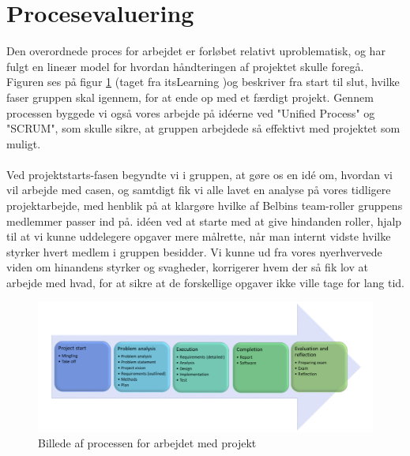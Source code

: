 \clearpage
\section{Procesevaluering}
Den overordnede proces for arbejdet er forløbet relativt uproblematisk, og har fulgt en lineær model for hvordan håndteringen af projektet skulle foregå. Figuren ses på figur \ref{fig:processen} (taget fra itsLearning \cite{url_process})og beskriver fra start til slut, hvilke faser gruppen skal igennem, for at ende op med et færdigt projekt. Gennem processen byggede vi også vores arbejde på idéerne ved "Unified Process" og "SCRUM", som skulle sikre, at gruppen arbejdede så effektivt med projektet som muligt.\\\\
Ved projektstarts-fasen begyndte vi i gruppen, at gøre os en idé om, hvordan vi vil arbejde med casen, og samtdigt fik vi alle lavet en analyse på vores tidligere projektarbejde, med henblik på at klargøre hvilke af Belbins team-roller gruppens medlemmer passer ind på. idéen ved at starte med at give hindanden roller, hjalp til at vi kunne uddelegere opgaver mere målrette, når man internt vidste hvilke styrker hvert medlem i gruppen besidder. Vi kunne ud fra vores nyerhvervede viden om hinandens styrker og svagheder, korrigerer hvem der så fik lov at arbejde med hvad, for at sikre at de forskellige opgaver ikke ville tage for lang tid. 
\begin{figure}[H]
    \centering
    \includegraphics[width=1\textwidth]{images/processen.png}
    \caption{Billede af processen for arbejdet med projekt}
    \label{fig:processen}
\end{figure}
